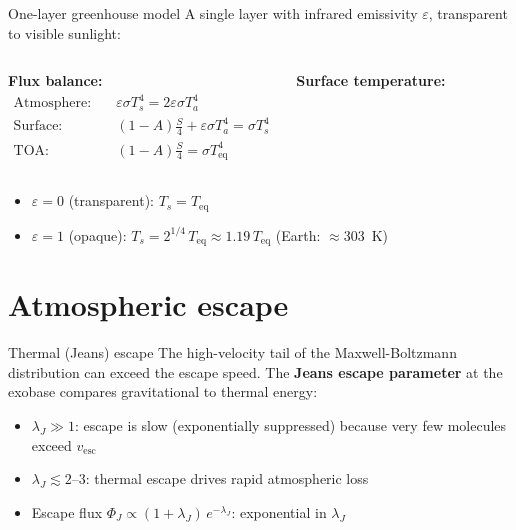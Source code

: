 \documentclass[aspectratio=169, 11pt]{beamer}
\begin{document}
\begin{frame}{One-layer greenhouse model}
  A single layer with infrared emissivity $\varepsilon$, transparent to visible sunlight:
  \vskip4pt
  \begin{columns}[T]
    \textbf{Flux balance:}
    \begin{align*}
      \text{Atmosphere:} & \quad \varepsilon\sigma T_s^4 = 2\varepsilon\sigma T_a^4 \\
      \text{Surface:} & \quad (1-A)\frac{S}{4} + \varepsilon\sigma T_a^4 = \sigma T_s^4 \\
      \text{TOA:} & \quad (1-A)\frac{S}{4} = \sigma T_{\mathrm{eq}}^4
    \end{align*}

    \textbf{Surface temperature:}
  \end{columns}
  \vskip6pt
  \begin{itemize}
    \item $\varepsilon = 0$ (transparent): $T_s = T_{\mathrm{eq}}$
    \item $\varepsilon = 1$ (opaque): $T_s = 2^{1/4}\,T_{\mathrm{eq}} \approx 1.19\,T_{\mathrm{eq}}$ (Earth: $\approx$303~K)
  \end{itemize}
\end{frame}


\section{Atmospheric escape}

\begin{frame}{Thermal (Jeans) escape}
  The high-velocity tail of the Maxwell-Boltzmann distribution can exceed the escape speed. The \textbf{Jeans escape parameter} at the exobase compares gravitational to thermal energy:
  \vskip4pt
  \vskip6pt
  \begin{itemize}
    \item $\lambda_J \gg 1$: escape is slow (exponentially suppressed) because very few molecules exceed $v_{\mathrm{esc}}$
    \item $\lambda_J \lesssim 2$--3: thermal escape drives rapid atmospheric loss
    \item Escape flux $\Phi_J \propto (1 + \lambda_J)\,e^{-\lambda_J}$: exponential in $\lambda_J$
  \end{itemize}
\end{frame}
\end{document}
